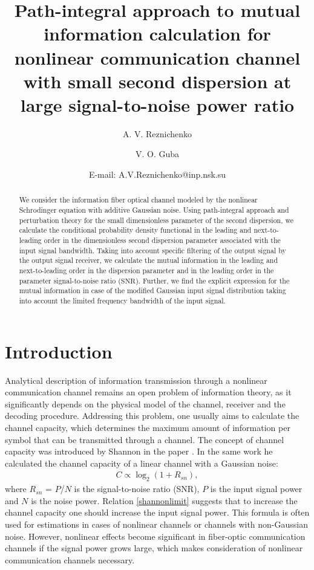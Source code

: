 \documentclass{article}
\title{Path-integral approach to mutual information calculation for nonlinear communication channel with small second dispersion at large signal-to-noise power ratio}
\author[1,2]{A. V. Reznichenko}
\author[1]{V. O. Guba}
\affil[1]{Theory department, Budker Institute of Nuclear Physics of Siberian Branch Russian
Academy of Sciences, Novosibirsk 630090, Russia}
\affil[2]{Novosibirsk State University, Novosibirsk 630090, Russia}
\date{E-mail: A.V.Reznichenko@inp.nsk.su}
\begin{document}
\maketitle

\begin{abstract}
    We consider the information fiber optical channel modeled by the nonlinear Schrodinger equation with additive Gaussian noise. Using path-integral approach and perturbation theory for the small dimensionless parameter of the second dispersion, we calculate the conditional probability density functional in the leading and next-to-leading order in the dimensionless second dispersion parameter associated with the input signal bandwidth. Taking into account specific filtering of the output signal by the output signal receiver, we calculate the mutual information in the leading and next-to-leading order in the dispersion parameter and in the leading order in the parameter signal-to-noise ratio ($\mathrm{SNR}$). Further, we find the explicit expression for the mutual information in case of the modified Gaussian input signal distribution taking into account the limited frequency bandwidth of the input signal. 
\end{abstract}

\section{Introduction}
Analytical description of information transmission through a nonlinear communication channel remains an open problem of information theory, as it significantly depends on the physical model of the channel, receiver and the decoding procedure. Addressing this problem, one usually aims to calculate the channel capacity, which determines the maximum amount of information per symbol that can be transmitted through a channel. The concept of channel capacity was introduced by Shannon in the paper \cite{shannon1948mathematical}. In the same work he calculated the channel capacity of a linear channel with a Gaussian noise: 
\begin{align}\label{shannonlimit}
   C \propto \log_{2}(1+R_{sn}),
\end{align}
where $R_{sn}$ = $P$/$N$ is the signal-to-noise ratio (SNR), $P$ is the input signal power and $N$ is the noise power. Relation \eqref{shannonlimit} suggests that to increase the channel capacity one should increase the input signal power. This formula is often used for estimations in cases of nonlinear channels or channels with non-Gaussian noise. However, nonlinear effects become significant in fiber-optic communication channels if the signal power grows large, which makes consideration of nonlinear communication channels necessary. 
\end{document}
